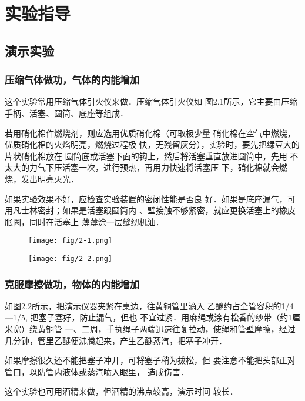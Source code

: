 \section{实验指导}
\subsection{演示实验}
\subsubsection{压缩气体做功，气体的内能增加}
这个实验常用压缩气体引火仪来做．压缩气体引火仪如
图2.1所示，它主要由压缩手柄、活塞、圆筒、底座等组成．

若用硝化棉作燃烧剂，则应选用优质硝化棉（可取极少量
硝化棉在空气中燃烧，优质硝化棉的火焰明亮，燃烧过程极
快，无残留灰分），实验时，要先把绿豆大的片状硝化棉放在
圆筒底或活塞下面的钩上，然后将活塞垂直放进圆筒中，先用
不太大的力气下压活塞一次，进行预热，再用力快速将活塞压
下，硝化棉就会燃烧，发出明亮火光．

如果实验效果不好，应检查实验装置的密闭性能是否良
好．如果是底座漏气，可用凡士林密封；如果是活塞跟圆筒内
、壁接触不够紧密，就应更换活塞上的橡皮胀圈，同时在活塞上
薄薄涂一层缝纫机油．

\begin{figure}[htp]\centering
    \begin{minipage}[t]{0.48\textwidth}
    \centering
\texttt{[image: fig/2-1.png]}
    \caption{}
    \end{minipage}
    \begin{minipage}[t]{0.48\textwidth}
    \centering
    \texttt{[image: fig/2-2.png]}
    \caption{}
    \end{minipage}
    \end{figure}

\subsubsection{克服摩擦做功，物体的内能增加}
如图2.2所示，把演示仪器夹紧在桌边，往黄铜管里滴入
乙醚约占全管容积的1/4—1/5, 把塞子塞好，防止漏气，但也
不宜过紧．用麻绳或涂有松香的纱带（约1厘米宽）绕黄铜管
一、二周，手执绳子两端迅速往复拉动，使绳和管壁摩擦，经过
几分钟，管里乙醚便沸腾起来，产生乙醚蒸汽，把塞子冲开．

如果摩擦很久还不能把塞子冲开，可将塞子稍为拔松，但
要注意不能把头部正对管口，以防管内液体或蒸汽喷入眼里，
造成伤害．

这个实验也可用酒精来做，但酒精的沸点较高，演示时间
较长．


